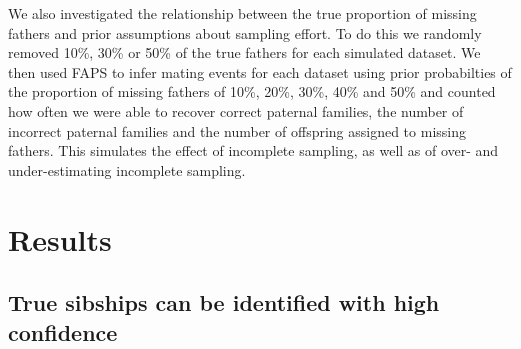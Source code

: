 \documentclass[10pt, a4paper, twocolumn]{article} %
\begin{document}
We also investigated the relationship between the true proportion of missing fathers and prior assumptions about sampling effort. To do this we randomly removed 10\%, 30\% or 50\% of the true fathers for each simulated dataset. We then used FAPS to infer mating events for each dataset using prior probabilties of the proportion of missing fathers of 10\%, 20\%, 30\%, 40\% and 50\% and counted how often we were able to recover correct paternal families, the number of incorrect paternal families and the number of offspring assigned to missing fathers. This simulates the effect of incomplete sampling, as well as of over- and under-estimating incomplete sampling.

\section{Results}

\subsection{True sibships can be identified with high confidence}
\end{document}
